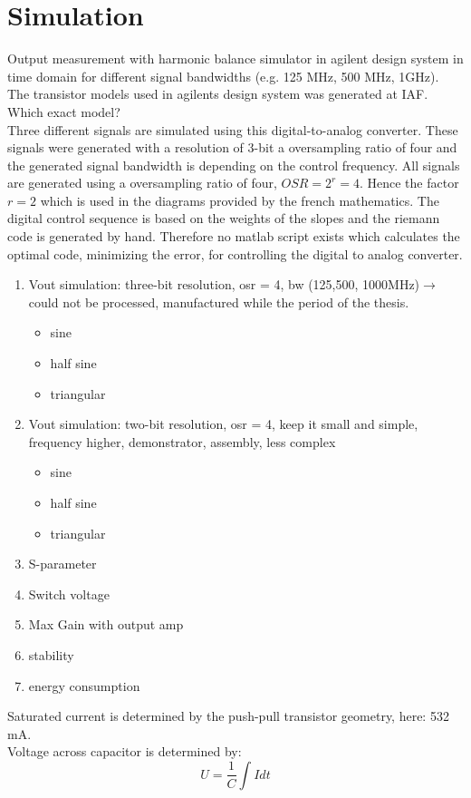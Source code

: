 \chapter{Simulation}
Output measurement with harmonic balance simulator in agilent design system in time domain for different signal bandwidths (e.g. 125 MHz, 500 MHz, 1GHz). The transistor models used in agilents design system was generated at IAF. Which exact model?\\
Three different signals are simulated using this digital-to-analog converter. These signals were generated with a resolution of 3-bit a oversampling ratio of four and the generated signal bandwidth is depending on the control frequency.
All signals are generated using a oversampling ratio of four, $OSR = 2^{r} = 4$. Hence the factor $r = 2$ which is used in the diagrams provided by the french mathematics. The digital control sequence is based on the weights of the slopes and the riemann code is generated by hand. Therefore no matlab script exists which calculates the optimal code, minimizing the error, for controlling the digital to analog converter. 
\begin{enumerate}
	\item Vout simulation: three-bit resolution, osr = 4, bw (125,500, 1000MHz)$\rightarrow$ could not be processed, manufactured while the period of the thesis. 
	\begin{itemize}
		\item sine
		\item half sine
		\item triangular
	\end{itemize}
	\item Vout simulation: two-bit resolution, osr = 4, keep it small and simple, frequency higher, demonstrator, assembly, less complex
	\begin{itemize}
		\item sine
		\item half sine
		\item triangular
	\end{itemize}
	\item S-parameter		
	\item Switch voltage
	\item Max Gain with output amp
	\item stability
	\item energy consumption
\end{enumerate}

Saturated current is determined by the push-pull transistor geometry, here: 532 mA.\\Voltage across capacitor is determined by:
\begin{equation}
U = \frac{1}{C} \int I  dt 
\end{equation}

